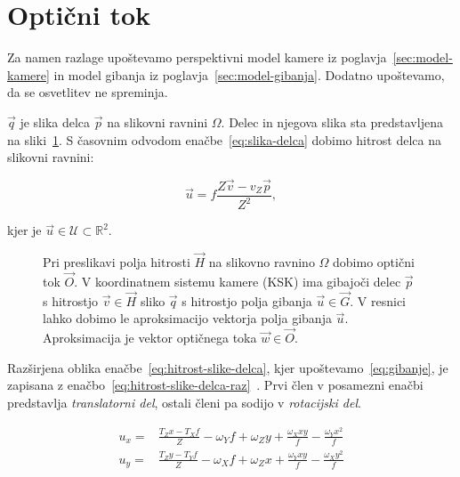 \section{Optični tok} \label{sec:opticni-tok}
Za namen razlage upoštevamo perspektivni model kamere iz poglavja~\ref{sec:model-kamere} in model gibanja iz poglavja~\ref{sec:model-gibanja}. Dodatno upoštevamo, da se osvetlitev ne spreminja.

$\vec{q}$ je slika delca $\vec{p}$ na slikovni ravnini $\varOmega$. Delec in njegova slika sta predstavljena na sliki~\ref{fig:optical-flow}. S časovnim odvodom enačbe~\eqref{eq:slika-delca} dobimo hitrost delca na slikovni ravnini:

\begin{equation}\label{eq:hitrost-slike-delca}
	\vec{u} = f \frac{Z\vec{v}-v_Z\vec{p}}{Z^2},
\end{equation}

kjer je $\vec{u} \in \mathcal{U} \subset \mathbb{R}^2$.




\begin{figure}[htb]
\centering

\caption[Preslikava hitrosti delca na slikovno ravnino $\varOmega$]{Pri preslikavi polja hitrosti $\vec{H}$ na slikovno ravnino $\varOmega$ dobimo optični tok $\vec{O}$. V koordinatnem sistemu kamere (KSK) ima gibajoči delec $\vec{p}$ s hitrostjo $\vec{v} \in \vec{H}$ sliko $\vec{q}$ s hitrostjo polja gibanja $\vec{u} \in \vec{G}$. V resnici lahko dobimo le aproksimacijo vektorja polja gibanja $\vec{u}$. Aproksimacija je vektor optičnega toka $\vec{w} \in \vec{O}$.}
\label{fig:optical-flow}
\end{figure}




Razširjena oblika enačbe~\eqref{eq:hitrost-slike-delca}, kjer upoštevamo~\eqref{eq:gibanje}, je zapisana z enačbo~\eqref{eq:hitrost-slike-delca-raz}~\cite{trucco1998introductory}. Prvi člen v posamezni enačbi predstavlja \emph{translatorni del}, ostali členi pa sodijo v \emph{rotacijski del}.

\begin{equation}\label{eq:hitrost-slike-delca-raz}
\begin{aligned}
	u_x = & \frac{T_Z x - T_X f}{Z} - \omega_Y f + \omega_Z y + \frac{\omega_X x y}{f} - \frac{\omega_Y x^2}{f} \\
    u_y = & \frac{T_Z y - T_Y f}{Z} - \omega_X f + \omega_Z x + \frac{\omega_Y x y}{f} - \frac{\omega_X y^2}{f}
\end{aligned}
\end{equation}

